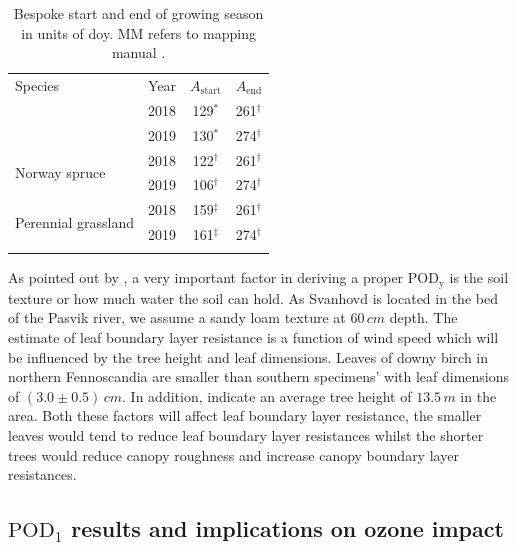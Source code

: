 \documentclass[bg, manuscript]{copernicus}
\begin{document}
\begin{table}[t]
  \caption{Bespoke start and end of growing season in units of \unit{doy}. MM refers to mapping manual \citep{GCB:Mills2011,ICP:MappingManual2017}.}
  \label{tab:sensitivity_tests_gs}
  \begin{tabular}{llcc}
    \tophline
    Species & Year & $A_\mathrm{start}$ & $A_\mathrm{end}$\\
    \middlehline
    \multirow{2}{*}{Downy birch} & 2018 & 129$^*$ & 261$^\dagger$ \\
    & 2019 & 130$^*$ & 274$^\dagger$ \\
    \multirow{2}{*}{Norway spruce} & 2018 & 122$^\dagger$ & 261$^\dagger$ \\
    & 2019 & 106$^\dagger$ & 274$^\dagger$ \\
    \multirow{2}{*}{Perennial grassland} & 2018 & 159$^\ddagger$ & 261$^\dagger$\\
    & 2019 & 161$^\ddagger$ & 274$^\dagger$ \\
    \bottomhline
  \end{tabular}
\end{table}


As pointed out by \citet{ACP:Bueker2012}, a very important factor in deriving a proper $\mathrm{POD_y}$ is the soil texture or how much water the soil can hold. As Svanhovd is located in the bed of the Pasvik river, we assume a sandy loam texture at $60\,\unit{cm}$ depth. The estimate of leaf boundary layer resistance is a function of wind speed which will be influenced by the tree height and leaf dimensions. Leaves of downy birch in northern Fennoscandia are smaller than southern specimens' with leaf dimensions of $(3.0\pm 0.5)\,\unit{cm}$. In addition, \citet[][p.~52]{NINA2004} indicate an average tree height of $13.5\,\unit{m}$ in the area. Both these factors will affect leaf boundary layer resistance, the smaller leaves would tend to reduce leaf boundary layer resistances whilst the shorter trees would reduce canopy roughness and increase canopy boundary layer resistances.

\subsection{$\mathrm{POD_1}$ results and implications on ozone impact}
\label{subsec:do3se_results}
\end{document}
